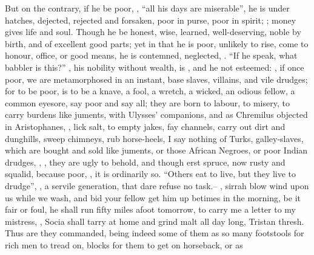 But on the contrary, if he be poor, , \enquote{all his days
are miserable}, he is under hatches, dejected, rejected and forsaken, poor in
purse, poor in spirit; ; money gives life and soul. Though he be
honest, wise, learned, well-deserving, noble by birth, and of excellent good
parts; yet in that he is poor, unlikely to rise, come to honour, office, or
good means, he is contemned, neglected, . \enquote{If he speak, what babbler is
this?} , his nobility without wealth, is , and he not esteemed: , if once poor, we are metamorphosed in an instant, base
slaves, villains, and vile drudges; for to be poor, is to
be a knave, a fool, a wretch, a wicked, an odious fellow, a common eyesore, say
poor and say all; they are born to labour, to misery, to carry burdens like
juments,  with Ulysses' companions, and as
Chremilus objected in Aristophanes, ,
lick salt, to empty jakes, fay channels, carry out dirt
and dunghills, sweep chimneys, rub horse-heels, \etc{} I say nothing of Turks,
galley-slaves, which are bought and sold like juments, or
those African Negroes, or poor Indian drudges, , \etc{} , they are ugly to behold, and though erst spruce, now rusty and squalid,
because poor, , it is ordinarily so. \enquote{Others eat to live, but they
live to drudge}, , a servile generation, that dare refuse no task.--
, sirrah blow wind upon us while we wash, and bid your
fellow get him up betimes in the morning, be it fair or foul, he shall run
fifty miles afoot tomorrow, to carry me a letter to my mistress, , Socia shall tarry at home and grind malt all day long, Tristan
thresh. Thus are they commanded, being indeed some of them as so many
footstools for rich men to tread on, blocks for them to get on horseback, or as
